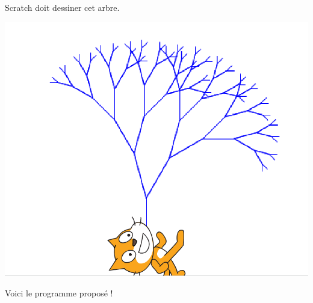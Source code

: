 \documentclass[class=report,crop=false, 12pt]{standalone}
\begin{document}
\begin{enigme}

Scratch doit dessiner cet arbre.
\begin{center}
  \includegraphics[scale=\scaleecran]{ecran-11-eg3} 
\end{center}


Voici le programme proposé !


\end{enigme}
\end{document}
